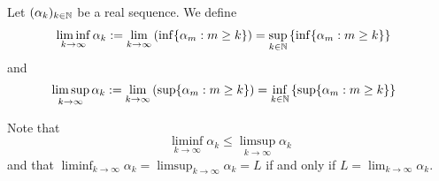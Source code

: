\begin{proposition}
\begin{definition}
Let $(\alpha_k)_{k\in \mathbb{N}}$ be a real sequence. We define
\begin{align*}
\liminf_{k\to \infty} \alpha_k
& := \lim_{k\to \infty} \left(\inf\{\alpha_m: m\geq k\}\right) = \sup_{k\in \mathbb{N}} \left\{\inf\{\alpha_m: m\geq k\}\right\}
\end{align*}
 and
 \begin{align*}
\limsup_{k\to \infty} \alpha_k
&:= \lim_{k\to \infty} \left(\sup\{\alpha_m: m\geq k\}\right) = \inf_{k\in \mathbb{N}} \left\{\sup\{\alpha_m: m\geq k\}\right\}
\end{align*}

Note that 
$$
\liminf_{k\to \infty} \alpha_k \leq \limsup_{k\to \infty} \alpha_k
$$
and that  $\liminf_{k\to \infty} \alpha_k = \limsup_{k\to \infty} \alpha_k = L$ if and only if $L=\lim_{k\to \infty} \alpha_k$.
\end{definition}

\bigskip
\begin{proposition}\label{p:limsup}
$ $


\end{proposition}
\end{proposition}
